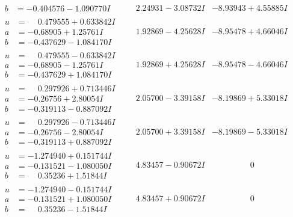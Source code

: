 \documentclass[1p]{elsarticle_modified}
\theoremstyle{definition}
\begin{document}
$$\begin{array}{c|c|c}
\begin{aligned}
b &= -0.404576 - 1.090770 I\end{aligned}
 & \phantom{-}2.24931 - 3.08732 I & -8.93943 + 4.55885 I \\ \hline\begin{aligned}
u &= \phantom{-}0.479555 + 0.633842 I \\
a &= -0.68905 + 1.25761 I \\
b &= -0.437629 - 1.084170 I\end{aligned}
 & \phantom{-}1.92869 - 4.25628 I & -8.95478 + 4.66046 I \\ \hline\begin{aligned}
u &= \phantom{-}0.479555 - 0.633842 I \\
a &= -0.68905 - 1.25761 I \\
b &= -0.437629 + 1.084170 I\end{aligned}
 & \phantom{-}1.92869 + 4.25628 I & -8.95478 - 4.66046 I \\ \hline\begin{aligned}
u &= \phantom{-}0.297926 + 0.713446 I \\
a &= -0.26756 + 2.80054 I \\
b &= -0.319113 - 0.887092 I\end{aligned}
 & \phantom{-}2.05700 - 3.39158 I & -8.19869 + 5.33018 I \\ \hline\begin{aligned}
u &= \phantom{-}0.297926 - 0.713446 I \\
a &= -0.26756 - 2.80054 I \\
b &= -0.319113 + 0.887092 I\end{aligned}
 & \phantom{-}2.05700 + 3.39158 I & -8.19869 - 5.33018 I \\ \hline\begin{aligned}
u &= -1.274940 + 0.151744 I \\
a &= -0.131521 - 1.080050 I \\
b &= \phantom{-}0.35236 + 1.51844 I\end{aligned}
 & \phantom{-}4.83457 - 0.90672 I & \phantom{-0.000000 } 0 \\ \hline\begin{aligned}
u &= -1.274940 - 0.151744 I \\
a &= -0.131521 + 1.080050 I \\
b &= \phantom{-}0.35236 - 1.51844 I\end{aligned}
 & \phantom{-}4.83457 + 0.90672 I & \phantom{-0.000000 } 0 \\ \hline\begin{aligned}

\end{aligned}
\end{array}$$
\end{document}
